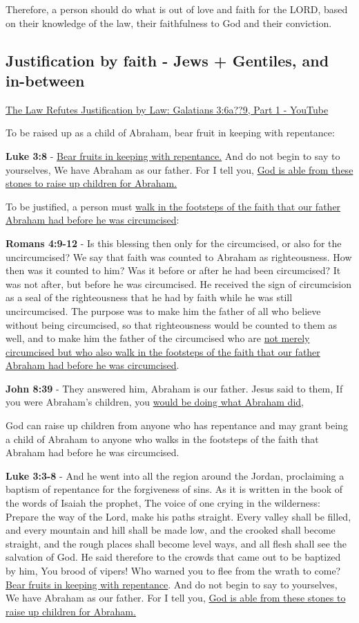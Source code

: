\documentclass[11pt]{article}
\begin{document}
Therefore, a person should do what is out of love and faith for the LORD, based on their knowledge of the law,
their faithfulness to God and their conviction.

\subsection{Justification by faith - Jews + Gentiles, and in-between}
\label{sec:org2b6f789}
\href{https://youtu.be/34pBf5pZq\_I?t=536}{The Law Refutes Justification by Law: Galatians 3:6a??9, Part 1 - YouTube}

To be raised up as a child of Abraham, bear fruit in keeping with repentance:

\textbf{Luke 3:8} - \uline{Bear fruits in keeping with repentance.} And do not begin to say to yourselves, We have Abraham as our father. For I tell you, \uline{God is able from these stones to raise up children for Abraham.}

To be justified, a person must \uline{walk in the footsteps of the faith that our father Abraham had before he was circumcised}:

\textbf{Romans 4:9-12} - Is this blessing then only for the circumcised, or also for the uncircumcised? We say that faith was counted to Abraham as righteousness. How then was it counted to him? Was it before or after he had been circumcised? It was not after, but before he was circumcised. He received the sign of circumcision as a seal of the righteousness that he had by faith while he was still uncircumcised. The purpose was to make him the father of all who believe without being circumcised, so that righteousness would be counted to them as well, and to make him the father of the circumcised who are \uline{not merely circumcised but who also walk in the footsteps of the faith that our father Abraham had before he was circumcised}.

\textbf{John 8:39} - They answered him, Abraham is our father. Jesus said to them, If you were Abraham's children, you \uline{would be doing what Abraham did},

God can raise up children from anyone who has repentance and may grant being a child of Abraham to anyone who walks in the footsteps of the faith that Abraham had before he was circumcised.

\textbf{Luke 3:3-8} - And he went into all the region around the Jordan, proclaiming a baptism of repentance for the forgiveness of sins. As it is written in the book of the words of Isaiah the prophet, The voice of one crying in the wilderness: Prepare the way of the Lord, make his paths straight. Every valley shall be filled, and every mountain and hill shall be made low, and the crooked shall become straight, and the rough places shall become level ways, and all flesh shall see the salvation of God. He said therefore to the crowds that came out to be baptized by him, You brood of vipers! Who warned you to flee from the wrath to come? \uline{Bear fruits in keeping with repentance}. And do not begin to say to yourselves, We have Abraham as our father. For I tell you, \uline{God is able from these stones to raise up children for Abraham.}
\end{document}
